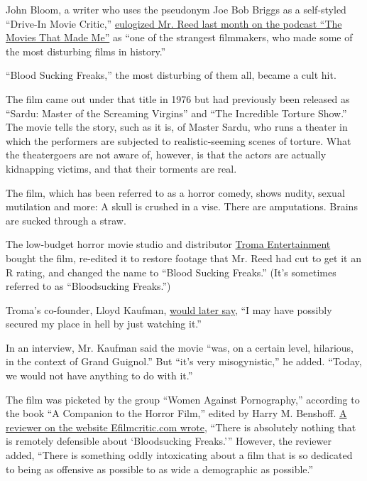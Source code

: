 John Bloom, a writer who uses the pseudonym Joe Bob Briggs as a
self-styled ``Drive-In Movie Critic,''
\href{https://trailersfromhell.com/podcast/joe-bob-briggs-rides-again/}{eulogized
Mr. Reed last month on the podcast ``The Movies That Made Me''} as ``one
of the strangest filmmakers, who made some of the most disturbing films
in history.''

``Blood Sucking Freaks,'' the most disturbing of them all, became a cult
hit.

The film came out under that title in 1976 but had previously been
released as ``Sardu: Master of the Screaming Virgins'' and ``The
Incredible Torture Show.'' The movie tells the story, such as it is, of
Master Sardu, who runs a theater in which the performers are subjected
to realistic-seeming scenes of torture. What the theatergoers are not
aware of, however, is that the actors are actually kidnapping victims,
and that their torments are real.

The film, which has been referred to as a horror comedy, shows nudity,
sexual mutilation and more: A skull is crushed in a vise. There are
amputations. Brains are sucked through a straw.

The low-budget horror movie studio and distributor
\href{https://www.nytimes3xbfgragh.onion/1992/07/20/movies/troma-the-film-studio-that-says-low-is-good-and-bad-may-be-better.html}{Troma
Entertainment} bought the film, re-edited it to restore footage that Mr.
Reed had cut to get it an R rating, and changed the name to ``Blood
Sucking Freaks.'' (It's sometimes referred to as ``Bloodsucking
Freaks.'')

Troma's co-founder, Lloyd Kaufman,
\href{https://www.dvdtalk.com/horror/blog/bloodsucking_freaks_not_about.html}{would
later say}, ``I may have possibly secured my place in hell by just
watching it.''

In an interview, Mr. Kaufman said the movie ``was, on a certain level,
hilarious, in the context of Grand Guignol.'' But ``it's very
misogynistic,'' he added. ``Today, we would not have anything to do with
it.''

The film was picketed by the group ``Women Against Pornography,''
according to the book ``A Companion to the Horror Film,'' edited by
Harry M. Benshoff.
\href{https://www.efilmcritic.com/review.php?movie=2540\&reviewer=248}{A
reviewer on the website Efilmcritic.com wrote}, ``There is absolutely
nothing that is remotely defensible about `Bloodsucking Freaks.'''
However, the reviewer added, ``There is something oddly intoxicating
about a film that is so dedicated to being as offensive as possible to
as wide a demographic as possible.''

